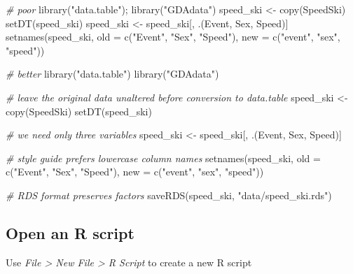 \documentclass[
]{book}
\newenvironment{Shaded}{\begin{snugshade}}{\end{snugshade}}
\newcommand{\AttributeTok}[1]{\textcolor[rgb]{0.77,0.63,0.00}{#1}}
\newcommand{\CommentTok}[1]{\textcolor[rgb]{0.56,0.35,0.01}{\textit{#1}}}
\newcommand{\FunctionTok}[1]{\textcolor[rgb]{0.00,0.00,0.00}{#1}}
\newcommand{\NormalTok}[1]{#1}
\newcommand{\OtherTok}[1]{\textcolor[rgb]{0.56,0.35,0.01}{#1}}
\newcommand{\StringTok}[1]{\textcolor[rgb]{0.31,0.60,0.02}{#1}}
\begin{document}
\begin{Shaded}
\begin{Highlighting}[]
\CommentTok{\# poor}
\FunctionTok{library}\NormalTok{(}\StringTok{"data.table"}\NormalTok{); }\FunctionTok{library}\NormalTok{(}\StringTok{"GDAdata"}\NormalTok{)}
\NormalTok{speed\_ski }\OtherTok{\textless{}{-}} \FunctionTok{copy}\NormalTok{(SpeedSki)}
\FunctionTok{setDT}\NormalTok{(speed\_ski)}
\NormalTok{speed\_ski }\OtherTok{\textless{}{-}}\NormalTok{ speed\_ski[, .(Event, Sex, Speed)]}
\FunctionTok{setnames}\NormalTok{(speed\_ski, }\AttributeTok{old =} \FunctionTok{c}\NormalTok{(}\StringTok{"Event"}\NormalTok{, }\StringTok{"Sex"}\NormalTok{, }\StringTok{"Speed"}\NormalTok{), }\AttributeTok{new =} \FunctionTok{c}\NormalTok{(}\StringTok{"event"}\NormalTok{, }\StringTok{"sex"}\NormalTok{, }\StringTok{"speed"}\NormalTok{))}

\CommentTok{\# better}
\FunctionTok{library}\NormalTok{(}\StringTok{"data.table"}\NormalTok{)}
\FunctionTok{library}\NormalTok{(}\StringTok{"GDAdata"}\NormalTok{)}

\CommentTok{\# leave the original data unaltered before conversion to data.table}
\NormalTok{speed\_ski }\OtherTok{\textless{}{-}} \FunctionTok{copy}\NormalTok{(SpeedSki)}
\FunctionTok{setDT}\NormalTok{(speed\_ski)}

\CommentTok{\# we need only three variables}
\NormalTok{speed\_ski }\OtherTok{\textless{}{-}}\NormalTok{ speed\_ski[, .(Event, Sex, Speed)]}

\CommentTok{\# style guide prefers lowercase column names}
\FunctionTok{setnames}\NormalTok{(speed\_ski, }
         \AttributeTok{old =} \FunctionTok{c}\NormalTok{(}\StringTok{"Event"}\NormalTok{, }\StringTok{"Sex"}\NormalTok{, }\StringTok{"Speed"}\NormalTok{), }
         \AttributeTok{new =} \FunctionTok{c}\NormalTok{(}\StringTok{"event"}\NormalTok{, }\StringTok{"sex"}\NormalTok{, }\StringTok{"speed"}\NormalTok{))}

\CommentTok{\# RDS format preserves factors}
\FunctionTok{saveRDS}\NormalTok{(speed\_ski, }\StringTok{"data/speed\_ski.rds"}\NormalTok{)}
\end{Highlighting}
\end{Shaded}

\hypertarget{open-an-r-script}{%
\subsection{Open an R script}\label{open-an-r-script}}

Use \emph{File \textgreater{} New File \textgreater{} R Script} to create a new R script
\end{document}
